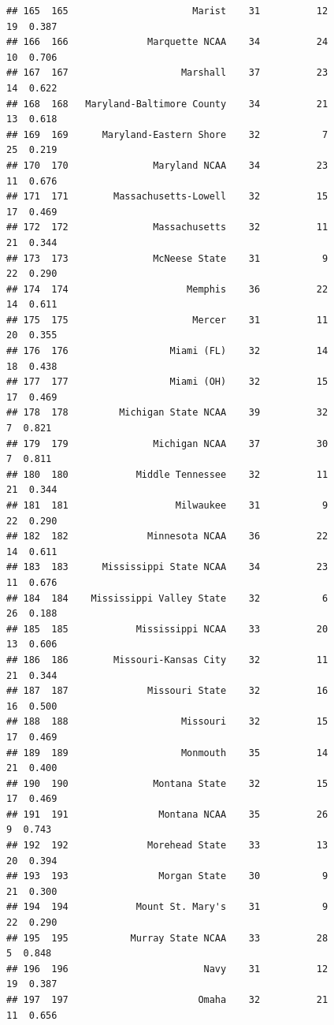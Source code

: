 \documentclass[]{book}
\begin{document}
\begin{verbatim}
## 165  165                      Marist    31          12            19  0.387
## 166  166              Marquette NCAA    34          24            10  0.706
## 167  167                    Marshall    37          23            14  0.622
## 168  168   Maryland-Baltimore County    34          21            13  0.618
## 169  169      Maryland-Eastern Shore    32           7            25  0.219
## 170  170               Maryland NCAA    34          23            11  0.676
## 171  171        Massachusetts-Lowell    32          15            17  0.469
## 172  172               Massachusetts    32          11            21  0.344
## 173  173               McNeese State    31           9            22  0.290
## 174  174                     Memphis    36          22            14  0.611
## 175  175                      Mercer    31          11            20  0.355
## 176  176                  Miami (FL)    32          14            18  0.438
## 177  177                  Miami (OH)    32          15            17  0.469
## 178  178         Michigan State NCAA    39          32             7  0.821
## 179  179               Michigan NCAA    37          30             7  0.811
## 180  180            Middle Tennessee    32          11            21  0.344
## 181  181                   Milwaukee    31           9            22  0.290
## 182  182              Minnesota NCAA    36          22            14  0.611
## 183  183      Mississippi State NCAA    34          23            11  0.676
## 184  184    Mississippi Valley State    32           6            26  0.188
## 185  185            Mississippi NCAA    33          20            13  0.606
## 186  186        Missouri-Kansas City    32          11            21  0.344
## 187  187              Missouri State    32          16            16  0.500
## 188  188                    Missouri    32          15            17  0.469
## 189  189                    Monmouth    35          14            21  0.400
## 190  190               Montana State    32          15            17  0.469
## 191  191                Montana NCAA    35          26             9  0.743
## 192  192              Morehead State    33          13            20  0.394
## 193  193                Morgan State    30           9            21  0.300
## 194  194            Mount St. Mary's    31           9            22  0.290
## 195  195           Murray State NCAA    33          28             5  0.848
## 196  196                        Navy    31          12            19  0.387
## 197  197                       Omaha    32          21            11  0.656

\end{verbatim}
\end{document}
